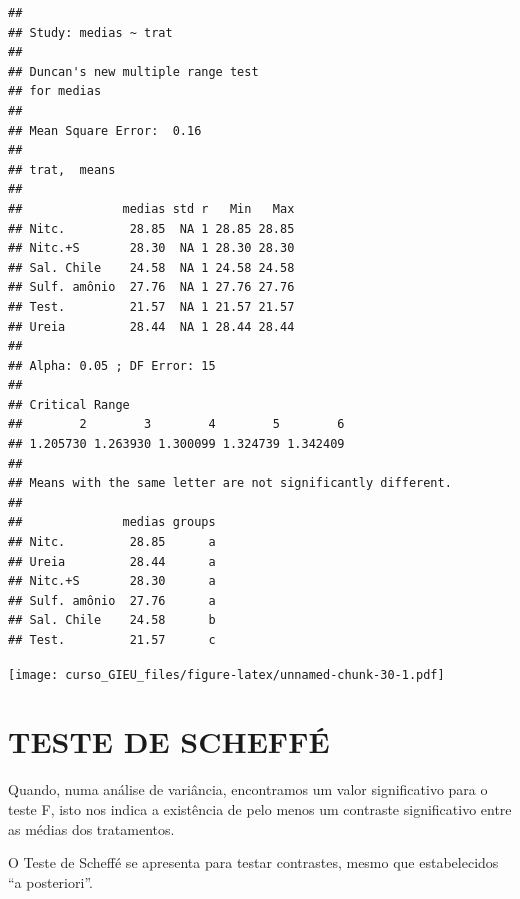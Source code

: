 \documentclass[
]{book}
\newenvironment{Shaded}{\begin{snugshade}}{\end{snugshade}}
\newcommand{\CommentTok}[1]{\textcolor[rgb]{0.56,0.35,0.01}{\textit{#1}}}
\newcommand{\DataTypeTok}[1]{\textcolor[rgb]{0.13,0.29,0.53}{#1}}
\newcommand{\DecValTok}[1]{\textcolor[rgb]{0.00,0.00,0.81}{#1}}
\newcommand{\FloatTok}[1]{\textcolor[rgb]{0.00,0.00,0.81}{#1}}
\newcommand{\KeywordTok}[1]{\textcolor[rgb]{0.13,0.29,0.53}{\textbf{#1}}}
\newcommand{\NormalTok}[1]{#1}
\newcommand{\OperatorTok}[1]{\textcolor[rgb]{0.81,0.36,0.00}{\textbf{#1}}}
\newcommand{\StringTok}[1]{\textcolor[rgb]{0.31,0.60,0.02}{#1}}
\begin{document}
\begin{verbatim}
## 
## Study: medias ~ trat
## 
## Duncan's new multiple range test
## for medias 
## 
## Mean Square Error:  0.16 
## 
## trat,  means
## 
##              medias std r   Min   Max
## Nitc.         28.85  NA 1 28.85 28.85
## Nitc.+S       28.30  NA 1 28.30 28.30
## Sal. Chile    24.58  NA 1 24.58 24.58
## Sulf. amônio  27.76  NA 1 27.76 27.76
## Test.         21.57  NA 1 21.57 21.57
## Ureia         28.44  NA 1 28.44 28.44
## 
## Alpha: 0.05 ; DF Error: 15 
## 
## Critical Range
##        2        3        4        5        6 
## 1.205730 1.263930 1.300099 1.324739 1.342409 
## 
## Means with the same letter are not significantly different.
## 
##              medias groups
## Nitc.         28.85      a
## Ureia         28.44      a
## Nitc.+S       28.30      a
## Sulf. amônio  27.76      a
## Sal. Chile    24.58      b
## Test.         21.57      c
\end{verbatim}

\begin{Shaded}
\end{Shaded}

\texttt{[image: curso\_GIEU\_files/figure-latex/unnamed-chunk-30-1.pdf]}

\hypertarget{teste-de-scheffuxe9}{%
\section{TESTE DE SCHEFFÉ}\label{teste-de-scheffuxe9}}

Quando, numa análise de variância, encontramos um valor significativo para o teste F, isto nos indica a existência de pelo menos um contraste significativo entre as médias dos tratamentos.

O Teste de Scheffé se apresenta para testar contrastes, mesmo que estabelecidos ``a posteriori''.
\end{document}
